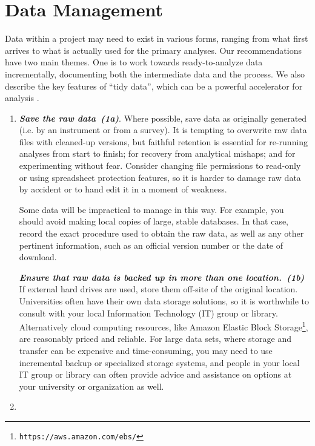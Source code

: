 \documentclass[10pt,letterpaper]{article}
\newcommand{\withurl}[2]{{#1}\footnote{{\texttt{#2}}}}
\newcommand{\practicesection}[2]{\section{#1}\label{#2}}
\newcommand{\practice}[2]{\textbf{\emph{{#2}~({#1})}}}
\begin{document}
\practicesection{Data Management}{sec:data}

Data within a project may need to exist in various forms, ranging from
what first arrives to what is actually used for the primary analyses.
Our recommendations have two main themes. One is to work towards
ready-to-analyze data incrementally, documenting both the intermediate
data and the process. We also describe the key features of ``tidy
data'', which can be a powerful accelerator for analysis
\cite{wickham2014,hart2016}.

\begin{enumerate}

\item

  \practice{1a}{Save the raw data}.  Where possible, save data as
  originally generated (i.e. by an instrument or from a survey).  It
  is tempting to overwrite raw data files with cleaned-up versions,
  but faithful retention is essential for re-running analyses from
  start to finish; for recovery from analytical mishaps; and for
  experimenting without fear. Consider changing file permissions to
  read-only or using spreadsheet protection features, so it is harder
  to damage raw data by accident or to hand edit it in a moment of
  weakness.

  Some data will be impractical to manage in this way. For example,
  you should avoid making local copies of large, stable databases.  In
  that case, record the exact procedure used to obtain the raw data,
  as well as any other pertinent information, such as an official
  version number or the date of download.
  
  \practice{1b}{Ensure that raw data is backed up in more than one
  location.} If external hard drives are used, store them off-site
  of the original location. Universities often have their own data
  storage solutions, so it is worthwhile to consult with your local
  Information Technology (IT) group or library.  Alternatively cloud
  computing resources, like \withurl{Amazon Elastic Block
  Storage}{https://aws.amazon.com/ebs/}, are reasonably priced and
  reliable.  For large data sets, where storage and transfer can be
  expensive and time-consuming, you may need to use incremental backup
  or specialized storage systems, and people in your local IT group or
  library can often provide advice and assistance on options at your
  university or organization as well.

\item


\end{enumerate}
\end{document}
